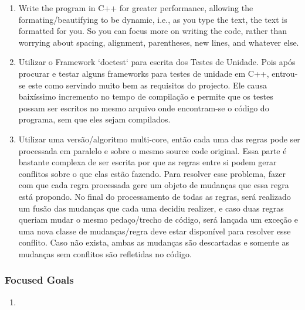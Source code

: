 \begin{englishtext}
    \begin{enumerate}[leftmargin=*]

        \item Write the program in C++ for greater performance, allowing the
        formating/beautifying to be dynamic, i.e., as you type the text, the
        text is formatted for you. So you can focus more on writing the code,
        rather than worrying about spacing, alignment, parentheses, new lines,
        and whatever else.

        \item

        Utilizar o Framework `doctest` para escrita dos Testes de Unidade. Pois após procurar e
        testar alguns frameworks para testes de unidade em C++, entrou-se este como servindo muito
        bem as requisitos do projecto. Ele causa baixíssimo incremento no tempo de compilação e
        permite que os testes possam ser escritos no mesmo arquivo onde encontram-se o código do
        programa, sem que eles sejam compilados.

        \item

        Utilizar uma versão/algoritmo multi-core, então cada uma das regras pode ser processada em
        paralelo e sobre o mesmo source code original. Essa parte é bastante complexa de ser escrita
        por que as regras entre si podem gerar conflitos sobre o que elas estão fazendo. Para
        resolver esse problema, fazer com que cada regra processada gere um objeto de mudanças que
        essa regra está propondo. No final do processamento de todas as regras, será realizado um
        fusão das mudanças que cada uma decidiu realizer, e caso duas regras queriam mudar o mesmo
        pedaço/trecho de código, será lançada um exceção e uma nova classe de mudanças/regra deve
        estar disponível para resolver esse conflito. Caso não exista, ambas as mudanças são
        descartadas e somente as mudanças sem conflitos são refletidas no código.

    \end{enumerate}


\subsubsection{Focused Goals}


    \begin{enumerate}[leftmargin=*]

        \item


\end{enumerate}
\end{englishtext}
